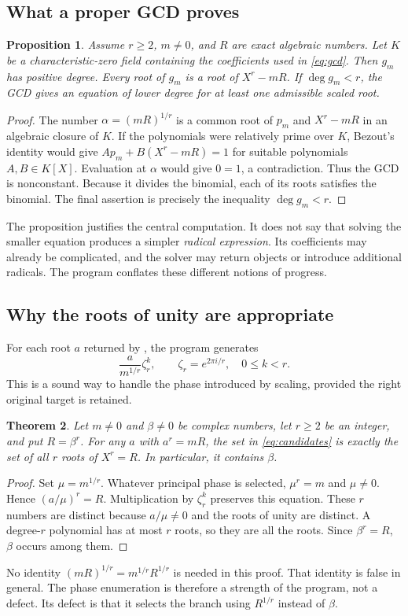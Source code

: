 \documentclass[11pt,letterpaper]{article}
\newcommand{\code}[1]{\texttt{\detokenize{#1}}}
\newtheorem{proposition}{Proposition}[section]
\newtheorem{theorem}[proposition]{Theorem}
\theoremstyle{definition}
\theoremstyle{remark}
\begin{document}
\subsection{What a proper GCD proves}
\begin{proposition}\label{prop:gcd}
Assume $r\ge2$, $m\ne0$, and $R$ are exact algebraic numbers. Let $K$ be a
characteristic-zero field containing the coefficients used in
\eqref{eq:gcd}. Then $g_m$ has positive degree. Every root of $g_m$ is a root
of $X^r-mR$. If $\deg g_m<r$, the GCD gives an equation of lower degree for
at least one admissible scaled root.
\end{proposition}
\begin{proof}
The number $\alpha=(mR)^{1/r}$ is a common root of $p_m$ and $X^r-mR$ in an
algebraic closure of $K$. If the polynomials were relatively prime over $K$,
Bezout's identity would give $A p_m+B(X^r-mR)=1$ for suitable polynomials
$A,B\in K[X]$. Evaluation at $\alpha$ would give $0=1$, a contradiction.
Thus the GCD is nonconstant. Because it divides the binomial, each of its
roots satisfies the binomial. The final assertion is precisely the
inequality $\deg g_m<r$.
\end{proof}
The proposition justifies the central computation. It does not say that
solving the smaller equation produces a simpler \emph{radical expression}.
Its coefficients may already be complicated, and the solver may return
\code{Root} objects or introduce additional radicals. The program conflates
these different notions of progress.

\subsection{Why the roots of unity are appropriate}
For each root $a$ returned by \code{Solve[g_m == 0, X]}, the program generates
\begin{equation}
 \frac{a}{m^{1/r}}\zeta_r^k,
 \qquad \zeta_r=e^{2\pi i/r},\quad 0\le k<r.\label{eq:candidates}
\end{equation}
This is a sound way to handle the phase introduced by scaling, provided the
right original target is retained.
\begin{theorem}\label{thm:phase}
Let $m\ne0$ and $\beta\ne0$ be complex numbers, let $r\ge2$ be an integer,
and put $R=\beta^r$. For any $a$ with $a^r=mR$, the set in
\eqref{eq:candidates} is exactly the set of all $r$ roots of $X^r=R$.
In particular, it contains $\beta$.
\end{theorem}
\begin{proof}
Set $\mu=m^{1/r}$. Whatever principal phase is selected, $\mu^r=m$ and
$\mu\ne0$. Hence $(a/\mu)^r=R$. Multiplication by $\zeta_r^k$ preserves this
equation. These $r$ numbers are distinct because $a/\mu\ne0$ and the roots of
unity are distinct. A degree-$r$ polynomial has at most $r$ roots, so they are
all the roots. Since $\beta^r=R$, $\beta$ occurs among them.
\end{proof}
No identity $(mR)^{1/r}=m^{1/r}R^{1/r}$ is needed in this proof. That identity
is false in general. The phase enumeration is therefore a strength of the
program, not a defect. Its defect is that it selects the branch using
$R^{1/r}$ instead of $\beta$.
\end{document}
